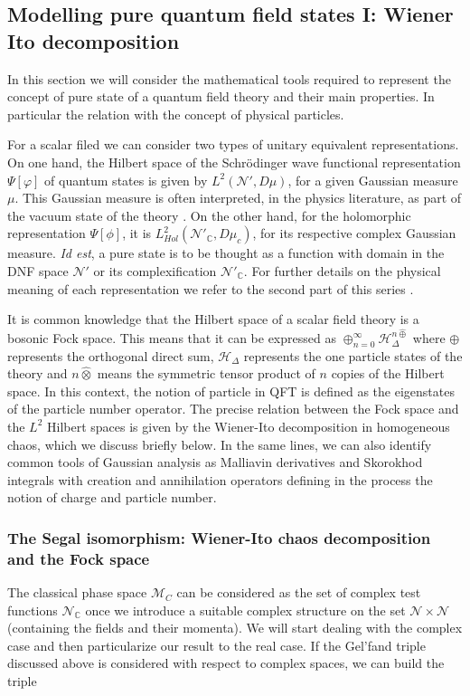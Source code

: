 \documentclass{elsarticle}%
\begin{document}
\subsection{Modelling pure  quantum field states I: Wiener Ito decomposition}
\label{ssec:WienerIto}
In this section we will consider the mathematical tools required to represent the concept of pure state of a quantum field theory and  their main properties. In particular the relation with the concept of physical particles.

For a scalar filed we can consider two types of unitary equivalent representations.  On one hand, the Hilbert space of the Schrödinger wave functional representation $\Psi[\varphi]$ of quantum states is given by $L^2(\mathcal{N}', D\mu)$, for a given Gaussian measure $\mu$.  This Gaussian measure is often interpreted, in the physics literature, as part of the vacuum state of the theory \cite{longSchrodingerWave1998,corichiSchrodingerFock2004,hofmannNonGaussianGroundstate2017}. On the other hand, for the holomorphic representation $\Psi[\phi]$, it is $L^2_{Hol}(\mathcal{N}'_\mathbb{C}, D\mu_c)$, for its respective complex Gaussian measure. \textit{Id est}, a pure state is to be thought as a function with domain in the DNF space $\mathcal{N}'$ or its complexification $\mathcal{N}'_\mathbb{C}$. For further details on the physical meaning of each representation we refer to the second part of this series  \cite{alonsoGeometricFlavours2024}.  

It is common knowledge that the Hilbert space of a scalar field theory is a bosonic Fock space. This  means that it can be expressed as $\oplus_{n=0}^\infty \mathcal{H}^{n\hat\oplus}_{\Delta}$ where $\oplus$ represents the orthogonal direct sum,  $\mathcal{H}_{\Delta}$ represents the one particle states of the theory and $n\hat\otimes$ means the symmetric tensor product of $n$ copies of the Hilbert space. In this context, the notion of particle in QFT is defined as the eigenstates of the  particle number operator.   The precise relation between the Fock space and the $L^2$ Hilbert spaces is given by the Wiener-Ito decomposition in homogeneous chaos, which we discuss briefly below. In the same lines, we can also identify common tools of Gaussian analysis as Malliavin derivatives and Skorokhod integrals with creation and annihilation operators defining in the process the notion of charge and particle number. 



\subsubsection{The Segal isomorphism: Wiener-Ito chaos decomposition and the Fock space}
The classical phase space $\mathcal{M}_C$ can be considered as the set of complex test functions $\mathcal{N}_\mathbb{C}$ once we introduce a suitable complex structure on the set $\mathcal{N}\times \mathcal{N}$ (containing the fields and their momenta). We will start dealing with the complex case and then particularize our result to the real case. If the Gel'fand triple discussed above is considered with respect to complex spaces, we can build the triple
\end{document}
